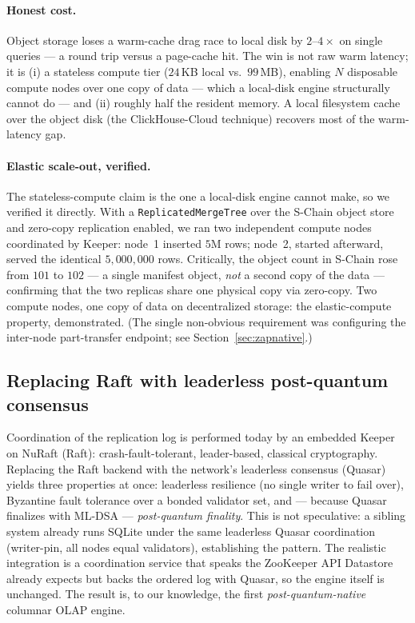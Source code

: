 \paragraph{Honest cost.} Object storage loses a warm-cache drag race to local
disk by $2$--$4\times$ on single queries --- a round trip versus a page-cache
hit. The win is not raw warm latency; it is (i) a stateless compute tier
($24$\,KB local vs.\ $99$\,MB), enabling $N$ disposable compute nodes over one
copy of data --- which a local-disk engine structurally cannot do --- and (ii)
roughly half the resident memory. A local filesystem cache over the object disk
(the ClickHouse-Cloud technique) recovers most of the warm-latency gap.

\paragraph{Elastic scale-out, verified.} The stateless-compute claim is the one
a local-disk engine cannot make, so we verified it directly. With a
\texttt{ReplicatedMergeTree} over the S-Chain object store and zero-copy
replication enabled, we ran two independent compute nodes coordinated by Keeper:
node~1 inserted $5$M rows; node~2, started afterward, served the identical
$5{,}000{,}000$ rows. Critically, the object count in S-Chain rose from $101$ to
$102$ --- a single manifest object, \emph{not} a second copy of the data ---
confirming that the two replicas share one physical copy via zero-copy. Two
compute nodes, one copy of data on decentralized storage: the elastic-compute
property, demonstrated. (The single non-obvious requirement was configuring the
inter-node part-transfer endpoint; see Section~\ref{sec:zapnative}.)

\subsection{Replacing Raft with leaderless post-quantum consensus}

Coordination of the replication log is performed today by an embedded
Keeper on NuRaft (Raft): crash-fault-tolerant, leader-based, classical
cryptography. Replacing the Raft backend with the network's leaderless
consensus (Quasar) yields three properties at once: leaderless resilience (no
single writer to fail over), Byzantine fault tolerance over a bonded validator
set, and --- because Quasar finalizes with ML-DSA --- \emph{post-quantum
finality}. This is not speculative: a sibling system already runs SQLite under
the same leaderless Quasar coordination (writer-pin, all nodes equal
validators), establishing the pattern. The realistic integration is a
coordination service that speaks the ZooKeeper API Datastore already expects but
backs the ordered log with Quasar, so the engine itself is unchanged. The result
is, to our knowledge, the first \emph{post-quantum-native} columnar OLAP engine.

